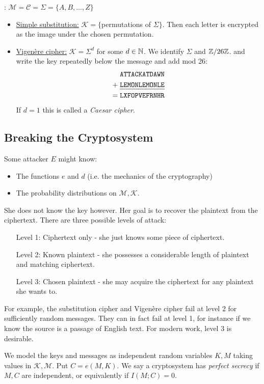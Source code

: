 \documentclass[10pt,a4paper]{article}
\begin{document}
: $\mathcal{M}=\mathcal{C} = \Sigma=\{A, B, \ldots, Z\}$
\begin{itemize}
\item \underline{Simple substitution:} $\mathcal{K} = \{$permutations of $\Sigma\}$. Then each letter is encrypted as the image under the chosen permutation.
\item \underline{Vigen\`{e}re cipher:} $\mathcal{K} = \Sigma^d$ for some $d \in \mathbb{N}$. We identify $\Sigma$ and $\mathbb{Z}/26\mathbb{Z}$. and write the key repeatedly below the message and add mod 26:
\setul{5pt}{.8pt}
\begin{align*}
&\texttt{ATTACKATDAWN}\\
+\;&\ul{\texttt{LEMONLEMONLE}}\\
=\;&\texttt{LXFOPVEFRNHR}
\end{align*}
If $d=1$ this is called a \emph{Caesar cipher}.
\end{itemize}
\subsection{Breaking the Cryptosystem}
Some attacker $E$ might know:
\begin{itemize}
\item The functions $e$ and $d$ (i.e. the mechanics of the cryptography)
\item The probability distributions  on $\mathcal{M}, \mathcal{K}$.
\end{itemize}
She does not know the key however. Her goal is to recover the plaintext from the ciphertext. There are three possible levels of attack:
\begin{itemize}
\item[Level 1:] Ciphertext only - she just knows some piece of ciphertext.
\item[Level 2:] Known plaintext - she possesses a considerable length of plaintext and matching ciphertext.
\item[Level 3:] Chosen plaintext - she may acquire the ciphertext for any plaintext she wants to.
\end{itemize}
For example, the substitution cipher and Vigen\`ere cipher fail at level 2 for sufficiently random messages. They can in fact fail at level 1, for instance if we know the source is a passage of English text. For modern work, level 3 is desirable.

We model the keys and messages as independent random variables $K, M$ taking values in $\mathcal{K, M}$. Put $C = e(M,K)$. We say a cryptosystem has \emph{perfect secrecy} if $M, C$ are independent, or equivalently if $I(M; C) = 0$.
\end{document}
